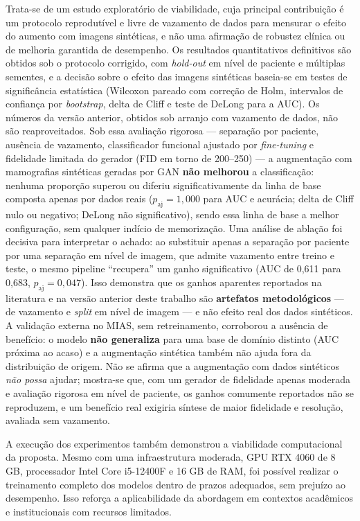 \documentclass[
	12pt,				%
	openright,			%
	oneside,			%
	a4paper,			%
	tcc,			%
	]{ABNT-DC-UEL}
\begin{document}
Trata-se de um estudo exploratório de viabilidade, cuja principal contribuição é um protocolo reprodutível e livre de vazamento de dados para mensurar o efeito do aumento com imagens sintéticas, e não uma afirmação de robustez clínica ou de melhoria garantida de desempenho. Os resultados quantitativos definitivos são obtidos sob o protocolo corrigido, com \textit{hold-out} em nível de paciente e múltiplas sementes, e a decisão sobre o efeito das imagens sintéticas baseia-se em testes de significância estatística (Wilcoxon pareado com correção de Holm, intervalos de confiança por \textit{bootstrap}, delta de Cliff e teste de DeLong para a AUC). Os números da versão anterior, obtidos sob arranjo com vazamento de dados, não são reaproveitados. Sob essa avaliação rigorosa — separação por paciente, ausência de vazamento, classificador funcional ajustado por \textit{fine-tuning} e fidelidade limitada do gerador (FID em torno de 200--250) — a augmentação com mamografias sintéticas geradas por GAN \textbf{não melhorou} a classificação: nenhuma proporção superou ou diferiu significativamente da linha de base composta apenas por dados reais ($p_{\text{aj}} = 1{,}000$ para AUC e acurácia; delta de Cliff nulo ou negativo; DeLong não significativo), sendo essa linha de base a melhor configuração, sem qualquer indício de memorização. Uma análise de ablação foi decisiva para interpretar o achado: ao substituir apenas a separação por paciente por uma separação em nível de imagem, que admite vazamento entre treino e teste, o mesmo pipeline ``recupera'' um ganho significativo (AUC de 0,611 para 0,683, $p_{\text{aj}} = 0{,}047$). Isso demonstra que os ganhos aparentes reportados na literatura e na versão anterior deste trabalho são \textbf{artefatos metodológicos} — de vazamento e \textit{split} em nível de imagem — e não efeito real dos dados sintéticos. A validação externa no MIAS, sem retreinamento, corroborou a ausência de benefício: o modelo \textbf{não generaliza} para uma base de domínio distinto (AUC próxima ao acaso) e a augmentação sintética também não ajuda fora da distribuição de origem. Não se afirma que a augmentação com dados sintéticos \emph{não possa} ajudar; mostra-se que, com um gerador de fidelidade apenas moderada e avaliação rigorosa em nível de paciente, os ganhos comumente reportados não se reproduzem, e um benefício real exigiria síntese de maior fidelidade e resolução, avaliada sem vazamento.

A execução dos experimentos também demonstrou a viabilidade computacional da proposta. Mesmo com uma infraestrutura moderada, GPU RTX 4060 de 8 GB, processador Intel Core i5-12400F e 16 GB de RAM, foi possível realizar o treinamento completo dos modelos dentro de prazos adequados, sem prejuízo ao desempenho. Isso reforça a aplicabilidade da abordagem em contextos acadêmicos e institucionais com recursos limitados.
\end{document}
